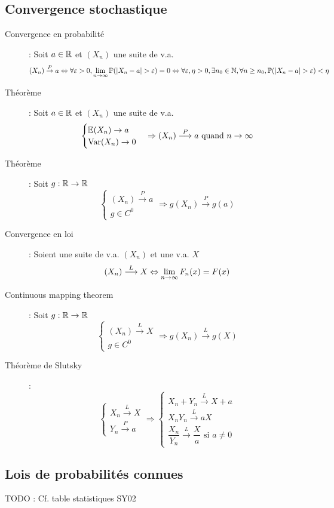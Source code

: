 \subsection{Convergence stochastique}
\begin{description}
\item[Convergence en probabilité] : Soit $a\in\mathbb{R}$ et $(X_n)$ une suite de v.a.
    \[
        (X_n) \overset{P}{\rightarrow} a
        \Leftrightarrow
        \forall\varepsilon >0, \limite{n}{\infty}\P(|X_n-a|>\varepsilon) = 0
        \Leftrightarrow
        \forall\varepsilon,\eta>0,\exists n_0\in\N, \forall n\ge n_0, \P(|X_n-a|>\varepsilon) < \eta
    \]
\item[Théorème] : Soit $a\in\mathbb{R}$ et $(X_n)$ une suite de v.a.
    \[
        \begin{cases}
            \mathbb{E}(X_n)\rightarrow a \\
            \textrm{Var}(X_n)\rightarrow 0
        \end{cases}
        \Rightarrow
        (X_n)\overset{P}\longrightarrow a \textrm{ quand } n\rightarrow\infty
    \]
\item[Théorème] : Soit $g:\mathbb{R}\rightarrow\mathbb{R}$
    \[
        \begin{cases}
            (X_n) \overset{P}{\longrightarrow} a\\
            g\in C^0
        \end{cases}
        \Rightarrow
        g(X_n)\overset{P}{\longrightarrow} g(a)
    \]
\item[Convergence en loi] : Soient une suite de v.a. $(X_n)$ et une v.a. $X$
    \[
        (X_n) \overset{L}{\longrightarrow} X
        \Leftrightarrow
        \lim_{n\rightarrow\infty} F_n(x) = F(x)
    \]
\item[Continuous mapping theorem] : Soit $g:\mathbb{R}\rightarrow\mathbb{R}$
    \[
        \begin{cases}
            (X_n) \overset{L}{\longrightarrow} X\\
            g\in C^0
        \end{cases}
        \Rightarrow
        g(X_n)\overset{L}{\longrightarrow} g(X)
    \]
\item[Théorème de Slutsky] : 
    \[
        \begin{cases}
            X_n \overset{L}{\longrightarrow} X \\
            Y_n \overset{P}{\longrightarrow} a
        \end{cases}
        \Rightarrow
        \begin{cases}
            X_n+Y_n \overset{L}{\longrightarrow} X+a \\
            X_nY_n \overset{L}{\longrightarrow} aX \\
            \dfrac{X_n}{Y_n} \overset{L}{\longrightarrow} \dfrac{X}{a}\textrm{ si } a\ne 0
        \end{cases}
    \]
\end{description}
\subsection{Lois de probabilités connues}
TODO : Cf. table statistiques SY02